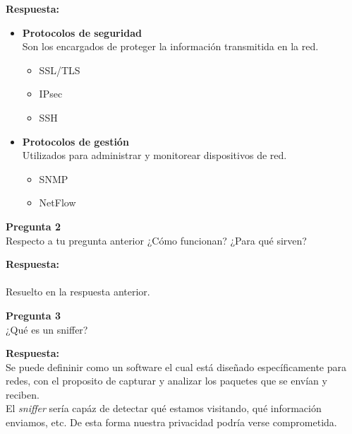 \documentclass{article}
\newenvironment{problem}[2][Pregunta]
    { \begin{mdframed}[backgroundcolor=gray!20] \textbf{#1 #2} \\}
    {  \end{mdframed}}
\newenvironment{solution}
    {\textbf{Respuesta:\\}}
    {}
\begin{document}
\begin{solution}
\begin{itemize}
        \item \textbf{Protocolos de seguridad}\\
        Son los encargados de proteger la información transmitida en la red.
        \begin{itemize}
            \item SSL/TLS
            \item IPsec
            \item SSH
        \end{itemize}

        \item \textbf{Protocolos de gestión}\\
        Utilizados para administrar y monitorear dispositivos de red.
        \begin{itemize}
            \item SNMP
            \item NetFlow
        \end{itemize}
    \end{itemize}
\end{solution}

\begin{problem}
    {2} Respecto a tu pregunta anterior ¿Cómo funcionan? ¿Para qué sirven?
\end{problem}

\begin{solution}\\
Resuelto en la respuesta anterior.
\end{solution}  

\begin{problem}
    {3} ¿Qué es un sniffer?
\end{problem}

\begin{solution}
Se puede defininir como un software el cual está diseñado específicamente para redes, con el proposito de capturar y analizar los paquetes que se envían y reciben.\\
El \textit{sniffer} sería capáz de detectar qué estamos visitando, qué información enviamos, etc. De esta forma nuestra privacidad podría verse comprometida.
\end{solution}
\end{document}
